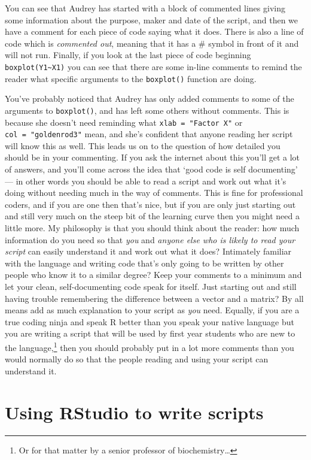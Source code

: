 \documentclass[
]{book}
\begin{document}
You can see that Audrey has started with a block of commented lines giving some information about the purpose, maker and date of the script, and then we have a comment for each piece of code saying what it does. There is also a line of code which is \emph{commented out}, meaning that it has a \# symbol in front of it and will not run. Finally, if you look at the last piece of code beginning \texttt{boxplot(Y1\textasciitilde{}X1)} you can see that there are some in-line comments to remind the reader what specific arguments to the \texttt{boxplot()} function are doing.

You've probably noticed that Audrey has only added comments to some of the arguments to \texttt{boxplot()}, and has left some others without comments. This is because she doesn't need reminding what \texttt{xlab\ =\ "Factor\ X"} or \texttt{col\ =\ "goldenrod3"} mean, and she's confident that anyone reading her script will know this as well. This leads us on to the question of how detailed you should be in your commenting. If you ask the internet about this you'll get a lot of answers, and you'll come across the idea that `good code is self documenting' --- in other words you should be able to read a script and work out what it's doing without needing much in the way of comments. This is fine for professional coders, and if you are one then that's nice, but if you are only just starting out and still very much on the steep bit of the learning curve then you might need a little more. My philosophy is that you should think about the reader: how much information do you need so that \emph{you} and \emph{anyone else who is likely to read your script} can easily understand it and work out what it does? Intimately familiar with the language and writing code that's only going to be written by other people who know it to a similar degree? Keep your comments to a minimum and let your clean, self-documenting code speak for itself. Just starting out and still having trouble remembering the difference between a vector and a matrix? By all means add as much explanation to your script as \emph{you} need. Equally, if you are a true coding ninja and speak R better than you speak your native language but you are writing a script that will be used by first year students who are new to the language,\footnote{Or for that matter by a senior professor of biochemistry\ldots{}} then you should probably put in a lot more comments than you would normally do so that the people reading and using your script can understand it.

\hypertarget{using-rstudio-to-write-scripts}{%
\section{Using RStudio to write scripts}\label{using-rstudio-to-write-scripts}}
\end{document}
